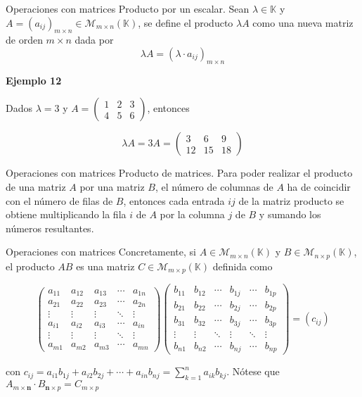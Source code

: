\documentclass[
  ignorenonframetext,
]{beamer}
\begin{document}
\begin{frame}{Operaciones con matrices}
\protect\hypertarget{operaciones-con-matrices-3}{}
Producto por un escalar. Sean \(\lambda\in\mathbb{K}\) y
\(A=(a_{ij})_{m\times n}\in\mathcal{M}_{m\times n}(\mathbb{K})\), se
define el producto \(\lambda A\) como una nueva matriz de orden
\(m\times n\) dada por \[\lambda A = (\lambda\cdot a_{ij})_{m\times n}\]

\textbf{Ejemplo 12}

Dados \(\lambda = 3\) y \(A=\begin{pmatrix}1&2&3\\4&5&6\end{pmatrix}\),
entonces

\[\lambda A=3A = \begin{pmatrix}3&6&9\\12&15&18\end{pmatrix}\]
\end{frame}

\begin{frame}{Operaciones con matrices}
\protect\hypertarget{operaciones-con-matrices-4}{}
Producto de matrices. Para poder realizar el producto de una matriz
\(A\) por una matriz \(B\), el número de columnas de \(A\) ha de
coincidir con el número de filas de \(B\), entonces cada entrada \(ij\)
de la matriz producto se obtiene multiplicando la fila \(i\) de \(A\)
por la columna \(j\) de \(B\) y sumando los números resultantes.
\end{frame}

\begin{frame}{Operaciones con matrices}
\protect\hypertarget{operaciones-con-matrices-5}{}
Concretamente, si \(A\in\mathcal{M}_{m\times n}(\mathbb{K})\) y
\(B\in\mathcal{M}_{n\times p}(\mathbb{K})\), el producto \(AB\) es una
matriz \(C\in\mathcal{M}_{m\times p}(\mathbb{K})\) definida como

\[\begin{pmatrix}a_{11}&a_{12}&a_{13}&\cdots & a_{1n}\\ a_{21}&a_{22}&a_{23}&\cdots & a_{2n}\\\vdots&\vdots&\vdots&\ddots&\vdots\\a_{i1}&a_{i2}&a_{i3}&\cdots & a_{in}\\\vdots&\vdots&\vdots&\ddots&\vdots\\a_{m1}&a_{m2}&a_{m3}&\cdots & a_{mn}\end{pmatrix}\begin{pmatrix}b_{11}&b_{12}&\cdots&b_{1j}&\cdots & b_{1p}\\ b_{21}&b_{22}&\cdots&b_{2j}&\cdots & b_{2p}\\b_{31}&b_{32}&\cdots&b_{3j}&\cdots & b_{3p}\\\vdots&\vdots&\ddots&\vdots&\ddots&\vdots\\b_{n1}&b_{n2}&\cdots&b_{nj}&\cdots & b_{np}\end{pmatrix} = (c_{ij})\]

con
\(c_{ij}=a_{i1}b_{1j}+a_{i2}b_{2j}+\cdots+a_{in}b_{nj}=\sum_{k=1}^na_{ik}b_{kj}\).
Nótese que
\(A_{m\times \textbf{n}}\cdot B_{\textbf{n}\times p}=C_{m\times p}\)
\end{frame}
\end{document}
